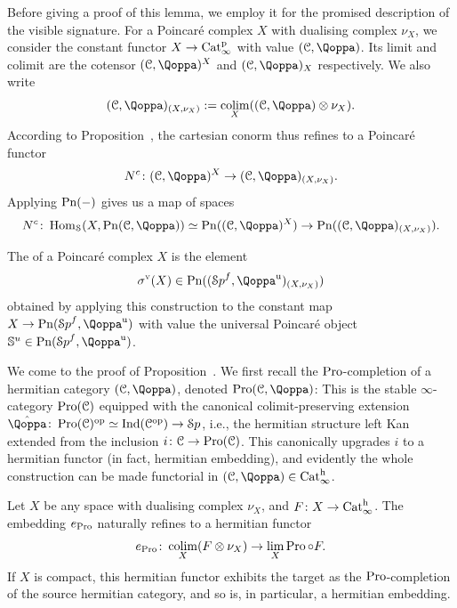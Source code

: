 Before giving a proof of this lemma, we employ it for the promised description of the visible signature. For a Poincar\'e complex $X$ with dualising complex $\nu_X$, we consider the constant functor $X\to \mathrm{Cat}^{\mathrm p}_\infty$ with value $(\C, \QF)$. Its limit and colimit are the cotensor $(\C, \QF)^X$ and $(\C, \QF)_X$ respectively. We also write 
\[
(\C, \QF)_{(X, \nu_X)}:= \colim_X ((\C, \QF)\otimes \nu_X).
\]
According to Proposition~, the cartesian conorm thus refines to a Poincar\'e functor 
\[
\cconorm\colon (\C, \QF)^X \to (\C, \QF)_{(X, \nu_X)}.
\]
Applying $\mathrm{Pn}(-)$ gives us a map of spaces
\[
\cconorm \colon \Hom_{\Sps}(X, \Poinc(\C, \QF)) \simeq \Poinc((\C, \QF)^X) \to \Poinc((\C, \QF)_{(X, \nu_X)}).
\]

\begin{definition}
\label{definition:visible-signature}%
The  of a Poincar\'e complex $X$ is the element 
\[
\vsign(X) \in \Poinc((\Spa^f, \QF^{\uni})_{(X, \nu_X)})
\]
obtained by applying this construction to the constant map $X\to \Poinc(\Spa^f, \QF^{\uni})$ with value the universal Poincar\'e object $\SS^u\in \Poinc(\Spa^f, \QF^{\uni})$. 
\end{definition}


We come to the proof of Proposition~. We first recall the $\operatorname{Pro}$-completion of a hermitian category $(\C, \QF)$, denoted $\Pro(\C, \QF)$: This is the stable $\infty$-category $\operatorname{Pro}(\mathcal C)$ equipped with the canonical colimit-preserving extension $\hat\QF\colon \Pro(\C)\op\simeq \Ind(\C\op)\to \Spa$, i.e., the hermitian structure left Kan extended from the inclusion $i\colon \mathcal C\to \operatorname{Pro}(\mathcal C)$. This canonically upgrades $i$ to a hermitian functor (in fact, hermitian embedding), and evidently the whole construction can be made functorial in $(\C, \QF)\in\Cath$. 

\begin{lemma}
\label{lemma:e_Pro_hermitian}%
Let $X$ be any space with dualising complex $\nu_X$, and $F\colon X\to \mathrm{Cat}^\mathrm{h}_\infty$. The embedding $e_{\operatorname{Pro}}$ naturally refines to a hermitian functor
\[
e_{\operatorname{Pro}}\colon \mathop{\mathrm{colim}}_X (F\otimes \nu_X) \to \lim_X \operatorname{Pro}\circ F.
\]
If $X$ is compact, this hermitian functor exhibits the target as the $\operatorname{Pro}$-completion of the source hermitian category, and so is, in particular, a hermitian embedding.
\end{lemma}

